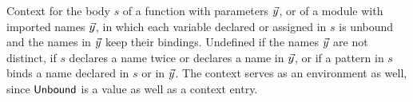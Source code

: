 Context for the body $s$ of a function with parameters $\seq{y}$, or of a module with imported names $\seq{y}$, in which each variable declared or assigned in $s$ is unbound and the names in $\seq{y}$ keep their bindings. Undefined if the names $\seq{y}$ are not distinct, if $s$ declares a name twice or declares a name in $\seq{y}$, or if a pattern in $s$ binds a name declared in $s$ or in $\seq{y}$. The context serves as an environment as well, since $\mathsf{Unbound}$ is a value as well as a context entry.
